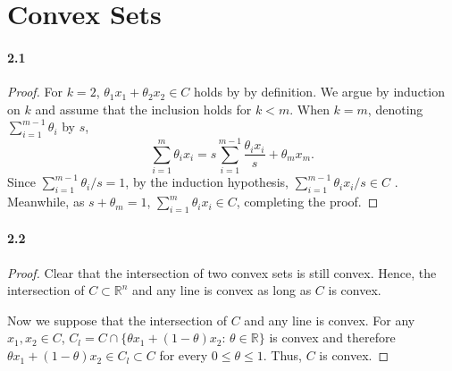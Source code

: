 \section{Convex Sets}

\paragraph{2.1}
\begin{proof}
  For $k=2$, $\theta_1x_1+\theta_2x_2\in C$ holds by by definition. We argue by
  induction on $k$ and assume that the inclusion holds for $k<m$. When $k=m$,
  denoting $\sum_{i=1}^{m-1}\theta_i$ by $s$,
  \[
    \sum_{i=1}^m \theta_ix_i = 
    s\sum_{i=1}^{m-1}\frac{\theta_ix_i}{s} + \theta_mx_m.
  \]
  Since $\sum_{i=1}^{m-1}\theta_i/s=1$, by the induction hypothesis,
  $\sum_{i=1}^{m-1}\theta_ix_i/s\in C$ . Meanwhile, as $s+\theta_m=1$, 
  $\sum_{i=1}^m\theta_ix_i\in C$, completing the proof.
\end{proof}

\paragraph{2.2}
\begin{proof}
  Clear that the intersection of two convex sets is still convex. Hence, the 
  intersection of $C\subset\mathbb{R}^n$ and any line is convex as long as $C$
  is convex.\par
  Now we suppose that the intersection of $C$ and any line is convex. For any 
  $x_1,x_2\in C$, $C_l=C\cap\{\theta x_1+(1-\theta)x_2:\,\theta\in\mathbb{R}\}$
  is convex and therefore $\theta x_1+(1-\theta)x_2\in C_l\subset C$ for every 
  $0\le\theta\le 1$. Thus, $C$ is convex.
\end{proof}

